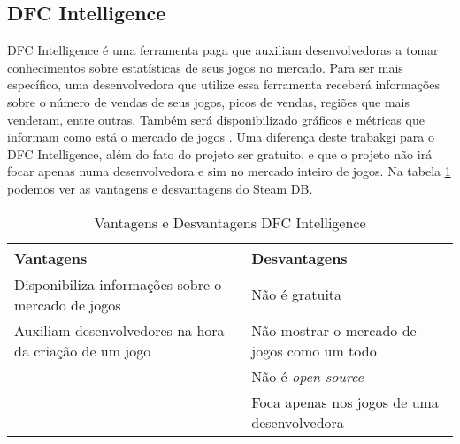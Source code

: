 \subsection{DFC Intelligence}
DFC Intelligence é uma ferramenta paga que auxiliam desenvolvedoras a tomar conhecimentos sobre estatísticas de seus jogos no mercado. Para ser mais específico, uma desenvolvedora que utilize essa ferramenta receberá informações sobre o número de vendas de seus jogos, picos de vendas, regiões que mais venderam, entre outras. Também será disponibilizado gráficos e métricas que informam como está o mercado de jogos \cite{dfc_intelligence}. Uma diferença deste trabakgi para o DFC Intelligence, além do fato do projeto ser gratuito, e que o projeto não irá focar apenas numa desenvolvedora e sim no mercado inteiro de jogos. Na tabela \ref{table:dfc_intelligence} podemos ver as vantagens e desvantagens do Steam DB.
\begin{table}
\centering
\begin{tabular}{|p{7cm}|p{7cm}|}
\hline \textbf{Vantagens} & \textbf{Desvantagens} \\
\hline Disponibiliza informações sobre o mercado de jogos & Não é gratuita \\
\hline Auxiliam desenvolvedores na hora da criação de um jogo & Não mostrar o mercado de jogos como um todo \\
\hline & Não é \textit{open source} \\
\hline & Foca apenas nos jogos de uma desenvolvedora \\
\hline
\end{tabular}
\caption{Vantagens e Desvantagens DFC Intelligence}
\label{table:dfc_intelligence}
\end{table}